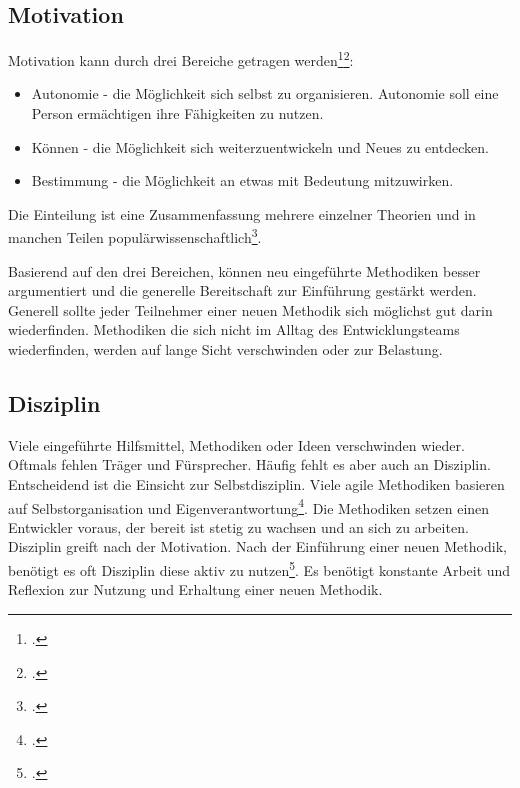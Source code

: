 \subsection{Motivation}

Motivation kann durch drei Bereiche getragen werden\footcite[vgl.][]{codingame-drive}\footcite[vgl.][Kap. Autonomie ff.]{pink-drive}:
\begin{itemize}
\item Autonomie - die Möglichkeit sich selbst zu organisieren. Autonomie soll eine Person ermächtigen ihre Fähigkeiten zu nutzen.
\item Können - die Möglichkeit sich weiterzuentwickeln und Neues zu entdecken.
\item Bestimmung - die Möglichkeit an etwas mit Bedeutung mitzuwirken.
\end{itemize}

Die Einteilung ist eine Zusammenfassung mehrere einzelner Theorien und in manchen Teilen populärwissenschaftlich\footcite[vgl.][]{drive-scholarly-review}. 

Basierend auf den drei Bereichen, können neu eingeführte Methodiken besser argumentiert und die generelle Bereitschaft zur Einführung gestärkt werden. Generell sollte jeder Teilnehmer einer neuen Methodik sich möglichst gut darin wiederfinden. Methodiken die sich nicht im Alltag des Entwicklungsteams wiederfinden, werden auf lange Sicht verschwinden oder zur Belastung.

\subsection{Disziplin}

Viele eingeführte Hilfsmittel, Methodiken oder Ideen verschwinden wieder. Oftmals fehlen Träger und Fürsprecher. Häufig fehlt es aber auch an Disziplin. Entscheidend ist die Einsicht zur Selbstdisziplin. Viele agile Methodiken basieren auf Selbstorganisation und Eigenverantwortung\footcite[vgl.][]{codingame-agile-failed}. Die Methodiken setzen einen Entwickler voraus, der bereit ist stetig zu wachsen und an sich zu arbeiten.
Disziplin greift nach der Motivation. Nach der Einführung einer neuen Methodik, benötigt es oft Disziplin diese aktiv zu nutzen\footcite[vgl.][]{screw-motivation}. Es benötigt konstante Arbeit und Reflexion zur Nutzung und Erhaltung einer neuen Methodik.

